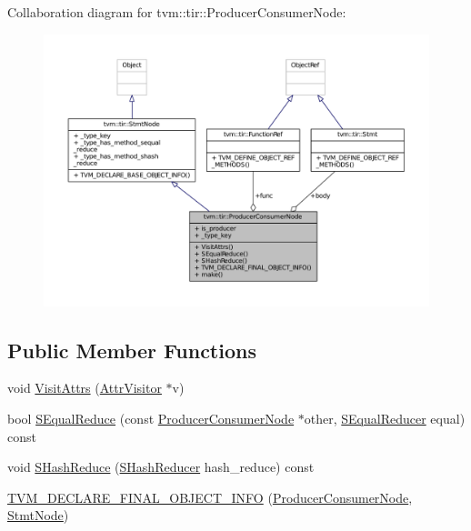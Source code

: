 Collaboration diagram for tvm\+:\+:tir\+:\+:Producer\+Consumer\+Node\+:
\nopagebreak
\begin{figure}[H]
\begin{center}
\leavevmode
\includegraphics[width=350pt]{classtvm_1_1tir_1_1ProducerConsumerNode__coll__graph}
\end{center}
\end{figure}
\subsection*{Public Member Functions}
\begin{DoxyCompactItemize}
\item 
void \hyperlink{classtvm_1_1tir_1_1ProducerConsumerNode_ab4e6b450d633132a9f0d8c50565fdd8e}{Visit\+Attrs} (\hyperlink{classtvm_1_1AttrVisitor}{Attr\+Visitor} $\ast$v)
\item 
bool \hyperlink{classtvm_1_1tir_1_1ProducerConsumerNode_a2ce3ac67db42d9c54729e661f6b5a403}{S\+Equal\+Reduce} (const \hyperlink{classtvm_1_1tir_1_1ProducerConsumerNode}{Producer\+Consumer\+Node} $\ast$other, \hyperlink{classtvm_1_1SEqualReducer}{S\+Equal\+Reducer} equal) const 
\item 
void \hyperlink{classtvm_1_1tir_1_1ProducerConsumerNode_acaab529d59e07cc163bb52fb96ce368c}{S\+Hash\+Reduce} (\hyperlink{classtvm_1_1SHashReducer}{S\+Hash\+Reducer} hash\+\_\+reduce) const 
\item 
\hyperlink{classtvm_1_1tir_1_1ProducerConsumerNode_ab269d8db81bd3952928675726c64dab4}{T\+V\+M\+\_\+\+D\+E\+C\+L\+A\+R\+E\+\_\+\+F\+I\+N\+A\+L\+\_\+\+O\+B\+J\+E\+C\+T\+\_\+\+I\+N\+FO} (\hyperlink{classtvm_1_1tir_1_1ProducerConsumerNode}{Producer\+Consumer\+Node}, \hyperlink{classtvm_1_1tir_1_1StmtNode}{Stmt\+Node})
\end{DoxyCompactItemize}
